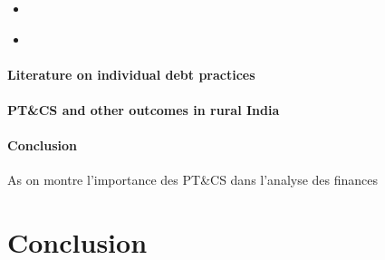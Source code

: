 \documentclass[a4paper, 11pt, onecolumn]{article}
\begin{document}
\cite{Forlicz2019}
\begin{itemize}
\item 
\end{itemize}

\cite{Bertaut2002}
\begin{itemize}
\item 
\end{itemize}

\paragraph{Literature on individual debt practices}

\paragraph{PT\&CS and other outcomes in rural India}

\paragraph{Conclusion}
As \cite{Brown2014} on montre l'importance des PT\&CS dans l'analyse des finances


\section{Conclusion}
\label{Conclusion}



\clearpage
\newpage
%




\newpage
\appendix
{}




\end{document}
